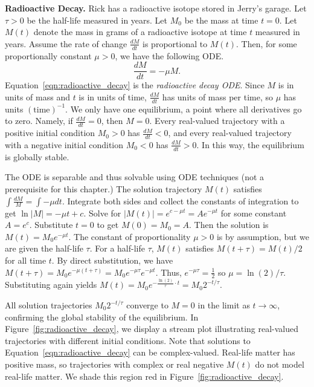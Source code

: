 \begin{example}\label{ex:radioactive_decay}
\textbf{Radioactive Decay.}
Rick has a radioactive isotope stored in Jerry's garage.
Let $\tau > 0$ be the half-life measured in years.
Let $M_0$ be the mass at time $t=0$.
Let $M(t)$ denote the mass in grams of a radioactive isotope at time $t$ measured in years.
Assume the rate of change $\frac{dM}{dt}$ is proportional to $M(t)$. Then, for some proportionally constant $\mu > 0$, we have the following ODE.
\begin{equation}\label{eqn:radioactive_decay}
\frac{dM}{dt} = -\mu M.
\end{equation}
Equation~\ref{eqn:radioactive_decay} is the \textit{radioactive decay ODE}.
Since $M$ is in units of mass and $t$ is in units of time, $\frac{dM}{dt}$ has units of mass per time, so $\mu$ has units $(\text{time})^{-1}$.
We only have one equilibrium, a point where all derivatives go to zero.
Namely, if $\frac{dM}{dt} = 0$, then $M = 0$.
Every real-valued trajectory with a positive initial condition $M_0 > 0$ has $\frac{dM}{dt} < 0$, and every real-valued trajectory with a negative initial condition $M_0 < 0$ has $\frac{dM}{dt} > 0$.
In this way, the equilibrium is globally stable.

The ODE is separable and thus solvable using ODE techniques (not a prerequisite for this chapter.)
The solution trajectory $M(t)$ satisfies $\int \frac{dM}{M} = \int -\mu dt$.
Integrate both sides and collect the constants of integration to get $\ln\left|M\right| = -\mu t + c$.
Solve for $\left|M(t)\right| = e^{c-\mu t} = Ae^{-\mu t}$ for some constant $A=e^c$.
Substitute $t = 0$ to get $M(0) = M_0 = A$. Then the solution is $M(t) = M_0e^{-\mu t}$.
The constant of proportionality $\mu > 0$ is by assumption, but we are given the half-life $\tau$.
For a half-life $\tau$, $M(t)$ satisfies $M(t+\tau) = M(t)/2$ for all time $t$.
By direct substitution, we have $M(t+\tau) = M_0e^{-\mu(t+\tau)} = M_0 e^{-\mu \tau} e^{-\mu t}$.
Thus, $e^{-\mu \tau} = \frac{1}{2}$ so $\mu = \ln(2)/\tau$.
Substituting again yields $M(t) = M_0e^{-\frac{\ln(2)}{\tau} \cdot t} = M_0 2^{-t/\tau}$.

All solution trajectories $M_0 2^{-t/\tau}$ converge to $M = 0$ in the limit as $t \to \infty$, confirming the global stability of the equilibrium.
In Figure~\ref{fig:radioactive_decay}, we display a stream plot illustrating real-valued trajectories with different initial conditions.
Note that solutions to Equation~\ref{eqn:radioactive_decay} can be complex-valued.
Real-life matter has positive mass, so trajectories with complex or real negative $M(t)$ do not model real-life matter.
We shade this region red in Figure~\ref{fig:radioactive_decay}.
\end{example}

